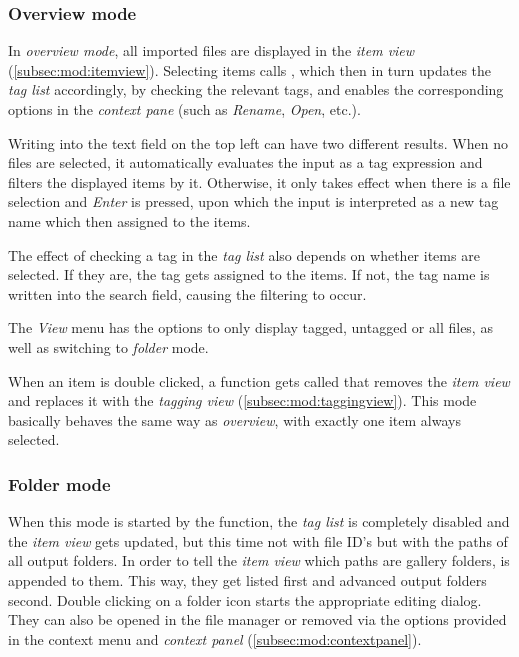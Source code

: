 \subsubsection{Overview mode}

In \emph{overview mode}, all imported files are displayed in the \emph{item view} (\cref{subsec:mod:itemview}). Selecting items calls , which then in turn updates the \emph{tag list} accordingly, by checking the relevant tags, and enables the corresponding options in the \emph{context pane} (such as \emph{Rename}, \emph{Open}, etc.). 

Writing into the text field on the top left can have two different results. When no files are selected, it automatically evaluates the input as a tag expression and filters the displayed items by it. Otherwise, it only takes effect when there is a file selection and \emph{Enter} is pressed, upon which the input is interpreted as  a new tag name which then assigned to the items. 

The effect of checking a tag in the \emph{tag list} also depends on whether items are selected. If they are, the tag gets assigned to the items. If not, the tag name is written into the search field, causing the filtering to occur.

The \emph{View} menu has the options to only display tagged, untagged or all files, as well as switching to \emph{folder} mode.

When an item is double clicked, a function gets called that removes the \emph{item view} and replaces it with the \emph{tagging view} (\cref{subsec:mod:taggingview}). This mode basically behaves the same way as \emph{overview}, with exactly one item always selected.

\subsubsection{Folder mode}
When this mode is started by the  function, the \emph{tag list} is completely disabled and the \emph{item view} gets updated, but this time not with file ID's but with the paths of all output folders. In order to tell the \emph{item view} which paths are gallery folders,  is appended to them. This way, they get listed first and advanced output folders second. Double clicking on a folder icon starts the appropriate editing dialog. They can also be opened in the file manager or removed via the options provided in the context menu and \emph{context panel} (\cref{subsec:mod:contextpanel}).

